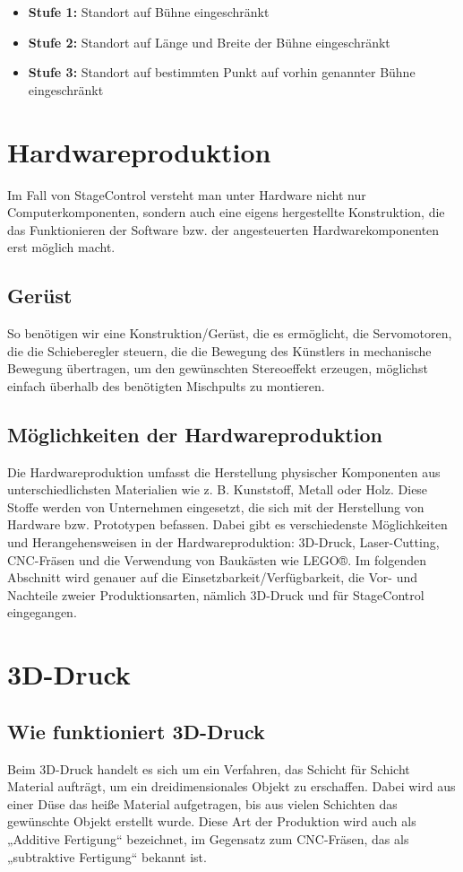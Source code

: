 \begin{itemize}
	\item \textbf{Stufe 1: }Standort auf Bühne eingeschränkt
	\item \textbf{Stufe 2: }Standort auf Länge und Breite der Bühne eingeschränkt
	\item \textbf{Stufe 3: }Standort auf bestimmten Punkt auf vorhin genannter Bühne eingeschränkt
\end{itemize}

\section{Hardwareproduktion }
Im Fall von StageControl versteht man unter Hardware nicht nur Computerkomponenten, sondern auch eine eigens hergestellte Konstruktion, die das Funktionieren der Software bzw. der angesteuerten Hardwarekomponenten erst möglich macht.

\subsection{Gerüst}
 So benötigen wir eine Konstruktion/Gerüst, die es ermöglicht, die Servomotoren, die die Schieberegler steuern, die die Bewegung des Künstlers in mechanische Bewegung übertragen, um den gewünschten Stereoeffekt erzeugen, möglichst einfach überhalb des benötigten Mischpults zu montieren.


\subsection{Möglichkeiten der Hardwareproduktion}
Die Hardwareproduktion umfasst die Herstellung physischer Komponenten aus unterschiedlichsten Materialien wie z. B. Kunststoff, Metall oder Holz. Diese Stoffe werden von Unternehmen eingesetzt, die sich mit der Herstellung von Hardware bzw. Prototypen befassen. Dabei gibt es verschiedenste Möglichkeiten und Herangehensweisen in der Hardwareproduktion: 3D-Druck, Laser-Cutting, CNC-Fräsen und die Verwendung von Baukästen wie LEGO®. Im folgenden Abschnitt wird genauer auf die Einsetzbarkeit/Verfügbarkeit, die Vor- und Nachteile zweier Produktionsarten, nämlich 3D-Druck und  für StageControl eingegangen.

\section{3D-Druck}
\subsection{Wie funktioniert 3D-Druck}
Beim 3D-Druck handelt es sich um ein Verfahren, das Schicht für Schicht Material aufträgt, um ein dreidimensionales Objekt zu erschaffen. Dabei wird aus einer Düse das heiße Material aufgetragen, bis aus vielen Schichten das gewünschte Objekt erstellt wurde. Diese Art der Produktion wird auch als „Additive Fertigung“ bezeichnet, im Gegensatz zum CNC-Fräsen, das als „subtraktive Fertigung“ bekannt ist.


